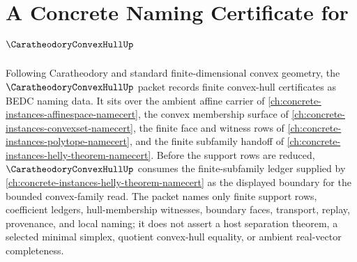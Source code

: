\chapter{A Concrete Naming Certificate for $\CaratheodoryConvexHullUp$}
\label{ch:concrete-instances-caratheodory-convex-hull-namecert}

Following Caratheodory and standard finite-dimensional convex geometry, the $\CaratheodoryConvexHullUp$ packet records finite convex-hull certificates as BEDC naming data. It sits over the ambient affine carrier of \autoref{ch:concrete-instances-affinespace-namecert}, the convex membership surface of \autoref{ch:concrete-instances-convexset-namecert}, the finite face and witness rows of \autoref{ch:concrete-instances-polytope-namecert}, and the finite subfamily handoff of \autoref{ch:concrete-instances-helly-theorem-namecert}. Before the support rows are reduced, $\CaratheodoryConvexHullUp$ consumes the finite-subfamily ledger supplied by \autoref{ch:concrete-instances-helly-theorem-namecert} as the displayed boundary for the bounded convex-family read. The packet names only finite support rows, coefficient ledgers, hull-membership witnesses, boundary faces, transport, replay, provenance, and local naming; it does not assert a host separation theorem, a selected minimal simplex, quotient convex-hull equality, or ambient real-vector completeness.

